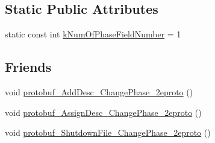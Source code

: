 \subsection*{Static Public Attributes}
\begin{DoxyCompactItemize}
\item 
static const int \hyperlink{class_change_phase_a19b42121df5751cc03a51d1244186f6b}{k\-Num\-Of\-Phase\-Field\-Number} = 1
\end{DoxyCompactItemize}
\subsection*{Friends}
\begin{DoxyCompactItemize}
\item 
void \hyperlink{class_change_phase_a4647c51e7b88278f5694cd14cbc5e191}{protobuf\-\_\-\-Add\-Desc\-\_\-\-Change\-Phase\-\_\-2eproto} ()
\item 
void \hyperlink{class_change_phase_a1fdbab9f17b7cba7ac51b7d21e9a0700}{protobuf\-\_\-\-Assign\-Desc\-\_\-\-Change\-Phase\-\_\-2eproto} ()
\item 
void \hyperlink{class_change_phase_a20ac3c1c2ccf4bf4b4a4f0841d1258f7}{protobuf\-\_\-\-Shutdown\-File\-\_\-\-Change\-Phase\-\_\-2eproto} ()
\end{DoxyCompactItemize}


